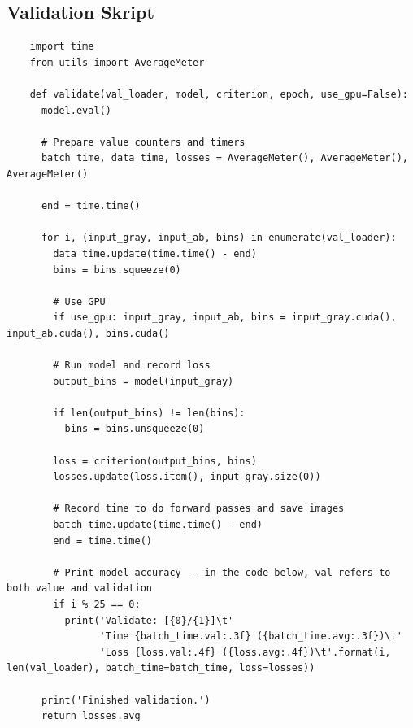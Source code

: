 \subsection{Validation Skript}
\begin{longlisting}
  \begin{verbatim}
    import time
    from utils import AverageMeter

    def validate(val_loader, model, criterion, epoch, use_gpu=False):
      model.eval()

      # Prepare value counters and timers
      batch_time, data_time, losses = AverageMeter(), AverageMeter(), AverageMeter()

      end = time.time()

      for i, (input_gray, input_ab, bins) in enumerate(val_loader):
        data_time.update(time.time() - end)
        bins = bins.squeeze(0)

        # Use GPU
        if use_gpu: input_gray, input_ab, bins = input_gray.cuda(), input_ab.cuda(), bins.cuda()

        # Run model and record loss
        output_bins = model(input_gray)

        if len(output_bins) != len(bins):
          bins = bins.unsqueeze(0)

        loss = criterion(output_bins, bins)
        losses.update(loss.item(), input_gray.size(0))

        # Record time to do forward passes and save images
        batch_time.update(time.time() - end)
        end = time.time()

        # Print model accuracy -- in the code below, val refers to both value and validation
        if i % 25 == 0:
          print('Validate: [{0}/{1}]\t'
                'Time {batch_time.val:.3f} ({batch_time.avg:.3f})\t'
                'Loss {loss.val:.4f} ({loss.avg:.4f})\t'.format(i, len(val_loader), batch_time=batch_time, loss=losses))

      print('Finished validation.')
      return losses.avg
  \end{verbatim}
\end{longlisting}

